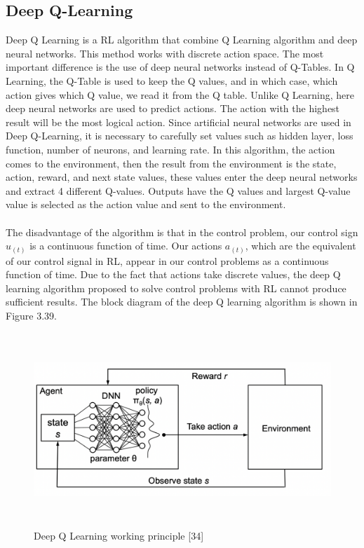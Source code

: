 \documentclass[12pt,twoside,a4]{mwbk}
\begin{document}
\subsection{Deep Q-Learning}
Deep Q Learning is a RL algorithm that combine Q Learning algorithm and deep neural networks. This method works with discrete action space. The most important difference is the use of deep neural networks instead of Q-Tables. In Q Learning, the Q-Table is used to keep the Q values, and in which case, which action gives which Q value, we read it from the Q table. Unlike Q Learning, here deep neural networks are used to predict actions. The action with the highest result will be the most logical action. Since artificial neural networks are used in Deep Q-Learning, it is necessary to carefully set values such as hidden layer, loss function, number of neurons, and learning rate. In this algorithm, the action comes to the environment, then the result from the environment is the state, action, reward, and next state values, these values enter the deep neural networks and extract 4 different Q-values. Outputs have the Q values and largest Q-value value is selected as the action value and sent to the environment.
\\ \\
The disadvantage of the algorithm is that in the control problem, our control sign $u_{(t)}$ is a continuous function of time. Our actions $a_{(t)}$, which are the equivalent of our control signal in RL, appear in our control problems as a continuous function of time. Due to the fact that actions take discrete values, the deep Q learning algorithm proposed to solve control problems with RL cannot produce sufficient results. The block diagram of the deep Q learning algorithm is shown in Figure 3.39.
\begin{figure}[h]
    \centering
    \includegraphics[width=16.0cm, height=7.3cm]{DNN.png}
    \caption{Deep Q Learning working principle [34]}
\end{figure}
\end{document}
